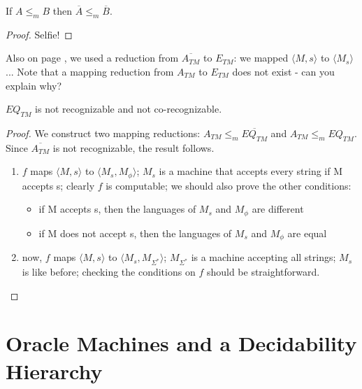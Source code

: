\begin{theorem}
If $A \leq_m B$ then  $\overline{A} \leq_m \overline{B}$.
\end{theorem}
\begin{proof}
Selfie!
\end{proof}


Also on page \pageref{nonreductie1}, we used a reduction from
$\overline{A_{TM}}$ to $E_{TM}$: we mapped $\langle M,s \rangle$ to
$\langle M_s \rangle$ ...  Note that a mapping reduction from
$A_{TM}$ to $E_{TM}$ does not exist - can you explain why?

\begin{theorem}
$EQ_{TM}$ is not recognizable and not co-recognizable.
\end{theorem}
\begin{proof}
We construct two mapping reductions: $A_{TM} \leq_m
\overline{EQ_{TM}}$ and $A_{TM} \leq_m EQ_{TM}$. Since
$\overline{A_{TM}}$ is not recognizable, the result follows.
\begin{enumerate}
\item $f$ maps $\langle M,s \rangle$ to $\langle M_s,M_\phi \rangle$;
  $M_s$ is a machine that accepts every string if M accepts s; clearly
  $f$ is computable; we should also prove the other conditions:
\begin{itemize}
\item if M accepts s, then the languages of $M_s$ and $M_\phi$ are
  different
\item if M does not accept s, then the languages of $M_s$ and $M_\phi$
  are equal
\end{itemize}

\item now, $f$ maps $\langle M,s \rangle$ to $\langle M_s,M_{\Sigma^*}
  \rangle$; $M_{\Sigma^*}$ is a machine accepting all strings; $M_s$
  is like before; checking the conditions on $f$ should be
straightforward.
\end{enumerate}
\end{proof}





\section{Oracle Machines and a Decidability Hierarchy}

